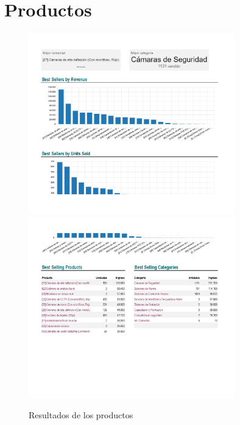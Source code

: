 \documentclass{report}
\begin{document}
        \section*{Productos}
            \begin{figure}[H]
                \centering
                \includegraphics[width=0.8\textwidth]{./img/Producto1.png}
                \includegraphics[width=0.8\textwidth]{./img/Producto2.png}
                \caption{Resultados de los productos}
            \end{figure}
\end{document}
